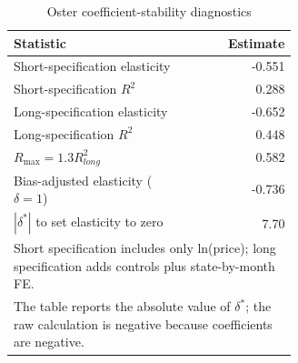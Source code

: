 \begin{table}[H]
\centering
\caption{Oster coefficient-stability diagnostics}
\label{tab:oster-bounds}
\centering
\begin{tabular}[t]{p{0.62\linewidth}r}
\toprule
Statistic & Estimate\\
\midrule
Short-specification elasticity & -0.551\\
Short-specification $R^2$ & 0.288\\
Long-specification elasticity & -0.652\\
Long-specification $R^2$ & 0.448\\
$R_{\max}=1.3R^2_{long}$ & 0.582\\
Bias-adjusted elasticity ($\delta=1$) & -0.736\\
$|\delta^*|$ to set elasticity to zero & 7.70\\
\bottomrule
\multicolumn{2}{p{0.78\linewidth}}{\footnotesize \rule{0pt}{1em}Short specification includes only ln(price); long specification adds controls plus state-by-month FE.}\\
\multicolumn{2}{p{0.78\linewidth}}{\footnotesize \rule{0pt}{1em}The table reports the absolute value of $\delta^*$; the raw calculation is negative because coefficients are negative.}\\
\end{tabular}
\end{table}
